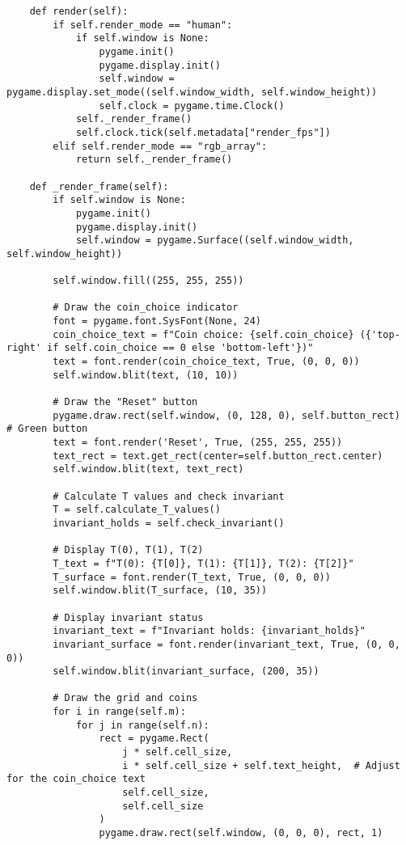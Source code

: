 \begin{lstlisting}
    def render(self):
        if self.render_mode == "human":
            if self.window is None:
                pygame.init()
                pygame.display.init()
                self.window = pygame.display.set_mode((self.window_width, self.window_height))
                self.clock = pygame.time.Clock()
            self._render_frame()
            self.clock.tick(self.metadata["render_fps"])
        elif self.render_mode == "rgb_array":
            return self._render_frame()

    def _render_frame(self):
        if self.window is None:
            pygame.init()
            pygame.display.init()
            self.window = pygame.Surface((self.window_width, self.window_height))

        self.window.fill((255, 255, 255))

        # Draw the coin_choice indicator
        font = pygame.font.SysFont(None, 24)
        coin_choice_text = f"Coin choice: {self.coin_choice} ({'top-right' if self.coin_choice == 0 else 'bottom-left'})"
        text = font.render(coin_choice_text, True, (0, 0, 0))
        self.window.blit(text, (10, 10))

        # Draw the "Reset" button
        pygame.draw.rect(self.window, (0, 128, 0), self.button_rect)  # Green button
        text = font.render('Reset', True, (255, 255, 255))
        text_rect = text.get_rect(center=self.button_rect.center)
        self.window.blit(text, text_rect)

        # Calculate T values and check invariant
        T = self.calculate_T_values()
        invariant_holds = self.check_invariant()

        # Display T(0), T(1), T(2)
        T_text = f"T(0): {T[0]}, T(1): {T[1]}, T(2): {T[2]}"
        T_surface = font.render(T_text, True, (0, 0, 0))
        self.window.blit(T_surface, (10, 35))

        # Display invariant status
        invariant_text = f"Invariant holds: {invariant_holds}"
        invariant_surface = font.render(invariant_text, True, (0, 0, 0))
        self.window.blit(invariant_surface, (200, 35))

        # Draw the grid and coins
        for i in range(self.m):
            for j in range(self.n):
                rect = pygame.Rect(
                    j * self.cell_size,
                    i * self.cell_size + self.text_height,  # Adjust for the coin_choice text
                    self.cell_size,
                    self.cell_size
                )
                pygame.draw.rect(self.window, (0, 0, 0), rect, 1)


\end{lstlisting}
